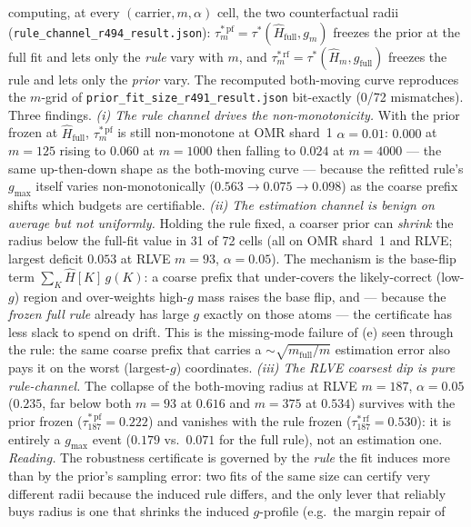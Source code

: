 \documentclass{article}
\theoremstyle{definition}
\theoremstyle{remark}
\begin{document}
computing, at every $(\text{carrier},m,\alpha)$ cell, the two
counterfactual radii (\texttt{rule\_channel\_r494\_result.json}):
$\tau^{*\,\mathrm{pf}}_m=\tau^*(\widehat H_{\mathrm{full}},g_m)$ freezes
the prior at the full fit and lets only the \emph{rule} vary with $m$,
and $\tau^{*\,\mathrm{rf}}_m=\tau^*(\widehat H_m,g_{\mathrm{full}})$
freezes the rule and lets only the \emph{prior} vary. The recomputed
both-moving curve reproduces the $m$-grid of
\texttt{prior\_fit\_size\_r491\_result.json} bit-exactly (0/72
mismatches). Three findings. \emph{(i) The rule channel drives the
non-monotonicity.} With the prior frozen at $\widehat H_{\mathrm{full}}$,
$\tau^{*\,\mathrm{pf}}_m$ is still non-monotone at OMR shard~1
$\alpha{=}0.01$: $0.000$ at $m{=}125$ rising to $0.060$ at $m{=}1000$
then falling to $0.024$ at $m{=}4000$ --- the same up-then-down shape as
the both-moving curve --- because the refitted rule's $g_{\max}$ itself
varies non-monotonically ($0.563\to0.075\to0.098$) as the coarse prefix
shifts which budgets are certifiable. \emph{(ii) The estimation channel
is benign on average but \emph{not} uniformly.} Holding the rule fixed,
a coarser prior can \emph{shrink} the radius below the full-fit value in
31 of 72 cells (all on OMR shard~1 and RLVE; largest deficit $0.053$ at
RLVE $m{=}93$, $\alpha{=}0.05$). The mechanism is the base-flip term
$\sum_K \widehat H[K]\,g(K)$: a coarse prefix that under-covers the
likely-correct (low-$g$) region and over-weights high-$g$ mass raises the
base flip, and --- because the \emph{frozen full rule} already has large
$g$ exactly on those atoms --- the certificate has less slack to spend on
drift. This is the missing-mode failure of (e) seen through the rule:
the same coarse prefix that carries a $\sim\!\sqrt{m_{\mathrm{full}}/m}$
estimation error also pays it on the worst (largest-$g$) coordinates.
\emph{(iii) The RLVE coarsest dip is pure rule-channel.} The collapse of
the both-moving radius at RLVE $m{=}187$, $\alpha{=}0.05$ ($0.235$, far
below both $m{=}93$ at $0.616$ and $m{=}375$ at $0.534$) survives with
the prior frozen ($\tau^{*\,\mathrm{pf}}_{187}=0.222$) and vanishes with
the rule frozen ($\tau^{*\,\mathrm{rf}}_{187}=0.530$): it is entirely a
$g_{\max}$ event ($0.179$ vs.\ $0.071$ for the full rule), not an
estimation one. \emph{Reading.} The robustness certificate is governed by
the \emph{rule} the fit induces more than by the prior's sampling error:
two fits of the same size can certify very different radii because the
induced rule differs, and the only lever that reliably buys radius is one
that shrinks the induced $g$-profile (e.g.\ the margin repair of
\end{document}
